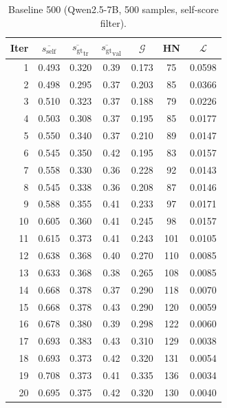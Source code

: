 \documentclass{article}
\newcommand{\gap}{\mathcal{G}}          %
\newcommand{\self}{s_{\text{self}}}     %
\newcommand{\gt}{s_{\text{gt}}}         %
\begin{document}
\begin{table}[h]
\centering
\caption{Baseline 500 (Qwen2.5-7B, 500 samples, self-score filter).}
\label{tab:app-baseline500}
\small
\begin{tabular}{rcccccc}
\toprule
Iter & $\overline{\self}$ & $\overline{\gt}_\text{tr}$ & $\overline{\gt}_\text{val}$ & $\gap$ & HN & $\mathcal{L}$ \\
\midrule
1  & 0.493 & 0.320 & 0.39 & 0.173 & 75  & 0.0598 \\
2  & 0.498 & 0.295 & 0.37 & 0.203 & 85  & 0.0366 \\
3  & 0.510 & 0.323 & 0.37 & 0.188 & 79  & 0.0226 \\
4  & 0.503 & 0.308 & 0.37 & 0.195 & 85  & 0.0177 \\
5  & 0.550 & 0.340 & 0.37 & 0.210 & 89  & 0.0147 \\
6  & 0.545 & 0.350 & 0.42 & 0.195 & 83  & 0.0157 \\
7  & 0.558 & 0.330 & 0.36 & 0.228 & 92  & 0.0143 \\
8  & 0.545 & 0.338 & 0.36 & 0.208 & 87  & 0.0146 \\
9  & 0.588 & 0.355 & 0.41 & 0.233 & 97  & 0.0171 \\
10 & 0.605 & 0.360 & 0.41 & 0.245 & 98  & 0.0157 \\
11 & 0.615 & 0.373 & 0.41 & 0.243 & 101 & 0.0105 \\
12 & 0.638 & 0.368 & 0.40 & 0.270 & 110 & 0.0085 \\
13 & 0.633 & 0.368 & 0.38 & 0.265 & 108 & 0.0085 \\
14 & 0.668 & 0.378 & 0.37 & 0.290 & 118 & 0.0070 \\
15 & 0.668 & 0.378 & 0.43 & 0.290 & 120 & 0.0059 \\
16 & 0.678 & 0.380 & 0.39 & 0.298 & 122 & 0.0060 \\
17 & 0.693 & 0.383 & 0.43 & 0.310 & 129 & 0.0038 \\
18 & 0.693 & 0.373 & 0.42 & 0.320 & 131 & 0.0054 \\
19 & 0.708 & 0.373 & 0.41 & 0.335 & 136 & 0.0034 \\
20 & 0.695 & 0.375 & 0.42 & 0.320 & 130 & 0.0040 \\
\bottomrule
\end{tabular}
\end{table}
\end{document}
